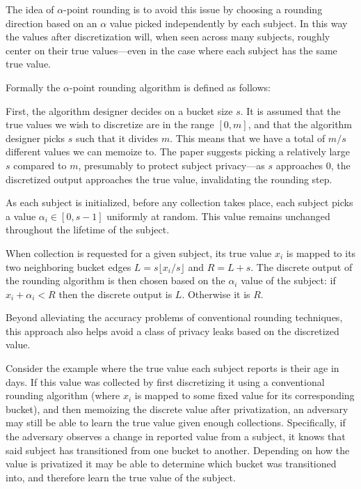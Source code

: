 \documentclass[12pt]{article}
\begin{document}
The idea of $\alpha$-point rounding is to avoid this issue by choosing a rounding direction based on an $\alpha$ value picked independently by each subject. In this way the values after discretization will, when seen across many subjects, roughly center on their true values---even in the case where each subject has the same true value. \bigskip

Formally the $\alpha$-point rounding algorithm is defined as follows:

First, the algorithm designer decides on a bucket size $s$. It is assumed that the true values we wish to discretize are in the range $[0,m]$, and that the algorithm designer picks $s$ such that it divides $m$. This means that we have a total of $m/s$ different values we can memoize to. The paper suggests picking a relatively large $s$ compared to $m$, presumably to protect subject privacy---as $s$ approaches 0, the discretized output approaches the true value, invalidating the rounding step.

As each subject is initialized, before any collection takes place, each subject picks a value $\alpha_i \in [0,s-1]$ uniformly at random. This value remains unchanged throughout the lifetime of the subject.

When collection is requested for a given subject, its true value $x_i$ is mapped to its two neighboring bucket edges $L=s \lfloor x_i / s \rfloor$ and $R=L+s$. The discrete output of the rounding algorithm is then chosen based on the $\alpha_i$ value of the subject: if $x_i + \alpha_i < R$ then the discrete output is $L$. Otherwise it is $R$. \bigskip

Beyond alleviating the accuracy problems of conventional rounding techniques, this approach also helps avoid a class of privacy leaks based on the discretized value.

Consider the example where the true value each subject reports is their age in days. If this value was collected by first discretizing it using a conventional rounding algorithm (where $x_i$ is mapped to some fixed value for its corresponding bucket), and then memoizing the discrete value after privatization, an adversary may still be able to learn the true value given enough collections. Specifically, if the adversary observes a change in reported value from a subject, it knows that said subject has transitioned from one bucket to another. Depending on how the value is privatized it may be able to determine which bucket was transitioned into, and therefore learn the true value of the subject.
\end{document}
